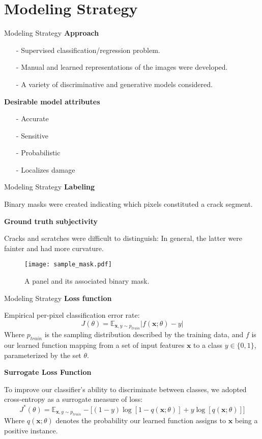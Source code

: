 \documentclass[10pt]{beamer}
\begin{document}
\section{Modeling Strategy}

\begin{frame}[fragile]{Modeling Strategy}
	\textbf{Approach}
	\begin{itemize}
	\item[-]Supervised classification/regression problem.
	\item[-]Manual and learned representations of the images were developed.
	\item[-]A variety of discriminative and generative models considered.
	\end{itemize}
	\textbf{Desirable model attributes}
	\begin{itemize}
		\item[-] Accurate
		\item[-] Sensitive
		\item[-] Probabilistic
		\item[-] Localizes damage
	\end{itemize}
\end{frame}

\begin{frame}[fragile]{Modeling Strategy}
	\textbf{Labeling}
	
	 Binary masks were created indicating which pixels constituted a crack segment.
	
	\textbf{Ground truth subjectivity}
	
	 Cracks and scratches were difficult to distinguish: In general, the latter were fainter and had more curvature.
	\begin{figure}
		\texttt{[image: sample\_mask.pdf]}
		\caption{A panel and its associated binary mask.}
	\end{figure}
\end{frame}

\begin{frame}[fragile]{Modeling Strategy}
	\textbf{Loss function}
	
	Empirical per-pixel classification error rate:
	\[
		J(\theta) = \mathbb{E}_{\mathbf{x}, y \sim p_{train}} |f(\mathbf{x};\theta) - y|
	\]
	Where $p_{train}$ is the sampling distribution described by the training data, and $f$ is our learned function mapping from a set of input features $\mathbf{x}$ to a class $y \in \{0, 1\}$, parameterized by the set $\theta$.
	
	\textbf{Surrogate Loss Function}
	
	To improve our classifier's ability to discriminate between classes, we adopted cross-entropy as a surrogate measure of loss:
	\[
		J^*(\theta) = \mathbb{E}_{\mathbf{x}, y \sim p_{train}} -\Big[(1-y)\log[1 - q(\mathbf{x}; \theta)] + y\log[ q(\mathbf{x}; \theta)]\Big]
	\]
	Where $q(\mathbf{x};\theta)$ denotes the probability our learned function assigns to $\mathbf{x}$ being a positive instance.
\end{frame}
\end{document}
